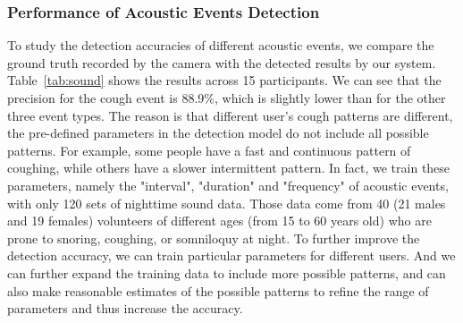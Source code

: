  \subsubsection{Performance of Acoustic Events Detection}

To study the detection accuracies of different acoustic events, we compare the ground truth recorded by the camera with the detected results by our system. Table~\ref{tab:sound} shows the results across 15 participants. We can see that the precision for the cough event is 88.9\%, which is slightly lower than for the other three event types. The reason is that different user's cough patterns are different, the pre-defined parameters in the detection model do not include all possible patterns. For example, some people have a fast and continuous pattern of coughing, while others have a slower intermittent pattern. In fact, we train these parameters, namely the "interval", "duration" and "frequency" of acoustic events, with only 120 sets of nighttime sound data. Those data come from 40 (21 males and 19 females) volunteers of different ages (from 15 to 60 years old) who are prone to snoring, coughing, or somniloquy at night. To further improve the detection accuracy, we can train particular parameters for different users. And we can further expand the training data to include more possible patterns, and can also make reasonable estimates of the possible patterns to refine the range of parameters and thus increase the accuracy.


